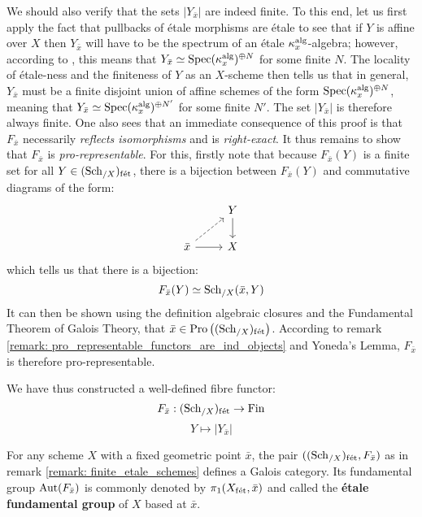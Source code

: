 \begin{remark}
            We should also verify that the sets $|Y_{\bar{x}}|$ are indeed finite. To this end, let us first apply the fact that pullbacks of \'etale morphisms are \'etale to see that if $Y$ is affine over $X$ then $Y_{\bar{x}}$ will have to be the spectrum of an \'etale $\kappa_x^{\mathrm{alg}}$-algebra; however, according to \cite[\href{https://stacks.math.columbia.edu/tag/00U3}{Tag 00U3}]{stacks}, this means that $Y_{\bar{x}} \simeq \mathrm{Spec} (\kappa_x^{\mathrm{alg}})^{\oplus N}$ for some finite $N$. The locality of \'etale-ness and the finiteness of $Y$ as an $X$-scheme then tells us that in general, $Y_{\bar{x}}$ must be a finite disjoint union of affine schemes of the form $\mathrm{Spec} (\kappa_x^{\mathrm{alg}})^{\oplus N}$, meaning that $Y_{\bar{x}} \simeq \mathrm{Spec} (\kappa_x^{\mathrm{alg}})^{\oplus N'}$ for some finite $N'$. The set $|Y_{\bar{x}}|$ is therefore always finite. One also sees that an immediate consequence of this proof is that $F_{\bar{x}}$ necessarily \textit{reflects isomorphisms} and is \textit{right-exact}. It thus remains to show that $F_{\bar{x}}$ is \textit{pro-representable}. For this, firstly note that because $F_{\bar{x}}(Y)$ is a finite set for all $Y \in (\mathrm{Sch}_{/X})_{\mathrm{f\acute{e}t}}$, there is a bijection between $F_{\bar{x}}(Y)$ and commutative diagrams of the form:
                $$
                    \begin{tikzcd}
                    	& Y \\
                    	{\bar{x}} & X
                    	\arrow[dashed, from=2-1, to=1-2]
                    	\arrow[from=2-1, to=2-2]
                    	\arrow[from=1-2, to=2-2]
                    \end{tikzcd}
                $$
            which tells us that there is a bijection:
                $$F_{\bar{x}}(Y) \simeq \mathrm{Sch}_{/X}(\bar{x}, Y)$$
            It can then be shown using the definition algebraic closures and the Fundamental Theorem of Galois Theory, that $\bar{x} \in \mathrm{Pro}\left((\mathrm{Sch}_{/X})_{\mathrm{f\acute{e}t}}\right)$. According to remark \ref{remark: pro_representable_functors_are_ind_objects} and Yoneda's Lemma, $F_{\bar{x}}$ is therefore pro-representable.
            
            We have thus constructed a well-defined fibre functor:
                $$F_{\bar{x}}: (\mathrm{Sch}_{/X})_{\mathrm{f\acute{e}t}} \to \mathrm{Fin}$$
                $$Y \mapsto |Y_{\bar{x}}|$$
        \end{remark}
        \begin{definition} \label{def: etale_fundamental_groups}
            For any scheme $X$ with a fixed geometric point $\bar{x}$, the pair $((\mathrm{Sch}_{/X})_{\mathrm{f\acute{e}t}}, F_{\bar{x}})$ as in remark \ref{remark: finite_etale_schemes} defines a Galois category. Its fundamental group $\mathrm{Aut}(F_{\bar{x}})$ is commonly denoted by $\pi_1(X_{\mathrm{f\acute{e}t}}, \bar{x})$ and called the \textbf{\'etale fundamental group} of $X$ based at $\bar{x}$.
        \end{definition}
        
